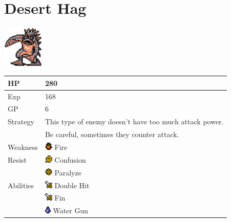 \section{Desert Hag}
\label{monster:desert_hag}

\includegraphics[height=2cm,keepaspectratio]{./resources/monster/desert_hag}

\begin{longtable}{ l p{9cm} }
	HP
	& 280
\\ \hline
	Exp
	& 168
\\ \hline
	GP
	& 6
\\ \hline
	Strategy
	& This type of enemy doesn't have too much attack power. \\
	& Be careful, sometimes they counter attack.
\\ \hline
	Weakness
	& \includegraphics[height=1em,keepaspectratio]{./resources/effects/fire} Fire
\\ \hline
	Resist
	& \includegraphics[height=1em,keepaspectratio]{./resources/effects/confusion} Confusion \\
	& \includegraphics[height=1em,keepaspectratio]{./resources/effects/paralyze} Paralyze
\\ \hline
	Abilities
	& \includegraphics[height=1em,keepaspectratio]{./resources/effects/damage} Double Hit \\
	& \includegraphics[height=1em,keepaspectratio]{./resources/effects/damage} Fin \\
	& \includegraphics[height=1em,keepaspectratio]{./resources/effects/water} Water Gun
\end{longtable}
